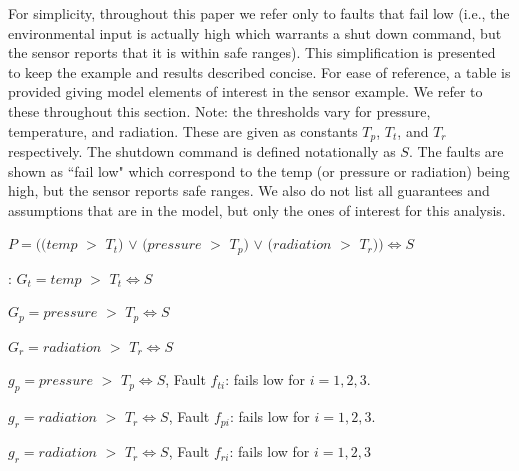 For simplicity, throughout this paper we refer only to faults that fail low (i.e., the environmental input is actually high which warrants a shut down command, but the sensor reports that it is within safe ranges). This simplification is presented to keep the example and results described concise. For ease of reference, a table is provided giving model elements of interest in the sensor example. We refer to these throughout this section. Note: the thresholds vary for pressure, temperature, and radiation. These are given as constants $T_p$, $T_t$, and $T_r$ respectively. The shutdown command is defined notationally as $S$.  The faults are shown as ``fail low" which correspond to the temp (or pressure or radiation) being high, but the sensor reports safe ranges. We also do not list all guarantees and assumptions that are in the model, but only the ones of interest for this analysis. 

\begin{description}[parsep=0.3ex]
 \item[PWR System:] $P = ((temp$ $>$ $T_t)$ $\lor$ $ (pressure$ $>$ $ T_p)$  $\lor$ $ (radiation$ $>$ $ T_r)) \iff S$\\
 \item[Temp Subsystem]: $G_t = temp$ $>$ $ T_t \iff S$\\
 \item[Pressure Subsystem:] $G_p = pressure$ $>$ $ T_p \iff S$\\
 \item[Radiation Subsystem:] $G_r = radiation$ $>$ $ T_r \iff S$\\
 \item[Temp Sensors (3):] $g_p = pressure$ $>$ $ T_p \iff S$, Fault $f_{ti}$: fails low for $i = 1, 2, 3$.\\
\item[Pressure Sensors (3):] $g_r = radiation$ $>$ $ T_r \iff S$, Fault $f_{pi}$: fails low for $i = 1, 2, 3$. \\
 \item[Radiation Sensors (3):] $g_r = radiation$ $>$ $ T_r \iff S$, Fault $f_{ri}$: fails low for $i = 1, 2, 3$\\
 \end{description}



